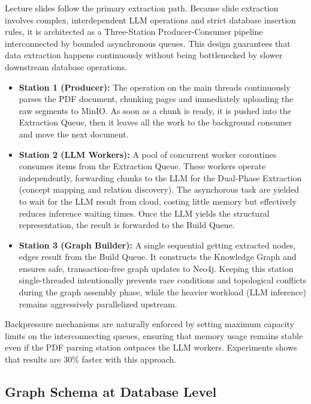 

Lecture slides follow the primary extraction path. Because slide extraction involves complex, interdependent LLM operations and strict database insertion rules, it is architected as a Three-Station Producer-Consumer pipeline interconnected by bounded asynchronous queues. This design guarantees that data extraction happens continuously without being bottlenecked by slower downstream database operations.

\begin{itemize}
    \item \textbf{Station 1 (Producer):} The operation on the main threads continuously parses the PDF document, chunking pages and immediately uploading the raw segments 
    to MinIO. As soon as a chunk is ready, it is pushed into the Extraction Queue, then it leaves all the work to the background consumer and move the next document.
    \item \textbf{Station 2 (LLM Workers):} A pool of concurrent worker coroutines consumes items from the Extraction Queue. These workers operate independently, 
    forwarding chunks to the LLM for the Dual-Phase Extraction (concept mapping and relation discovery). The asynchorous task are yielded to wait for the LLM 
    result from cloud, costing little memory but effectively reduces inference waiting times. Once the LLM yields the structural representation, the result is 
    forwarded to the Build Queue.
    \item \textbf{Station 3 (Graph Builder):} A single sequential getting extracted nodes, edges result from the Build Queue. It constructs the Knowledge Graph 
    and ensures safe, transaction-free graph updates to Neo4j. Keeping this station single-threaded intentionally prevents race conditions and topological conflicts 
    during the graph assembly phase, while the heavier workload (LLM inference) remains aggressively parallelized upstream.
\end{itemize}

Backpressure mechanisms are naturally enforced by setting maximum capacity limits on the interconnecting queues, ensuring that memory usage remains stable even if the 
PDF parsing station outpaces the LLM workers. Experiments shows that results are 30\% faster with this approach.


\subsection{Graph Schema at Database Level}

